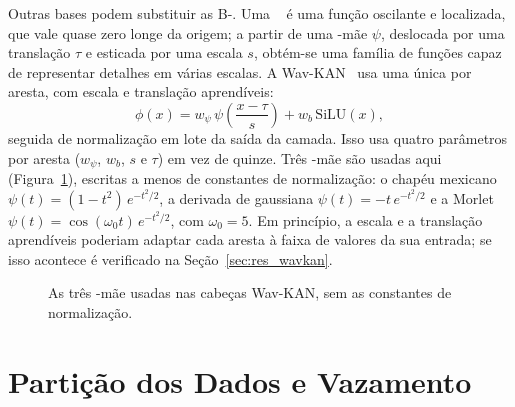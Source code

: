 Outras bases podem substituir as B-. Uma ~\cite{mallat2009wavelet} é uma função oscilante e localizada, que vale quase zero longe da origem; a partir de uma -mãe $\psi$, deslocada por uma translação $\tau$ e esticada por uma escala $s$, obtém-se uma família de funções capaz de representar detalhes em várias escalas. A Wav-KAN~\cite{bozorgasl2024wavkan} usa uma única  por aresta, com escala e translação aprendíveis:
\begin{equation}
\phi(x) = w_\psi\, \psi\!\left(\frac{x - \tau}{s}\right) + w_b\,\mathrm{SiLU}(x),
\end{equation}
seguida de normalização em lote da saída da camada. Isso usa quatro parâmetros por aresta ($w_\psi$, $w_b$, $s$ e $\tau$) em vez de quinze. Três -mãe são usadas aqui (Figura~\ref{fig:wavelets}), escritas a menos de constantes de normalização: o chapéu mexicano $\psi(t) = (1 - t^2)\,e^{-t^2/2}$, a derivada de gaussiana $\psi(t) = -t\,e^{-t^2/2}$ e a Morlet $\psi(t) = \cos(\omega_0 t)\,e^{-t^2/2}$, com $\omega_0 = 5$. Em princípio, a escala e a translação aprendíveis poderiam adaptar cada aresta à faixa de valores da sua entrada; se isso acontece é verificado na Seção~\ref{sec:res_wavkan}.

\begin{figure}[htpb]
\centering
{}
\caption{As três -mãe usadas nas cabeças Wav-KAN, sem as constantes de normalização.}
\label{fig:wavelets}
\end{figure}

\section{Partição dos Dados e Vazamento}
\label{sec:leakage_background}

